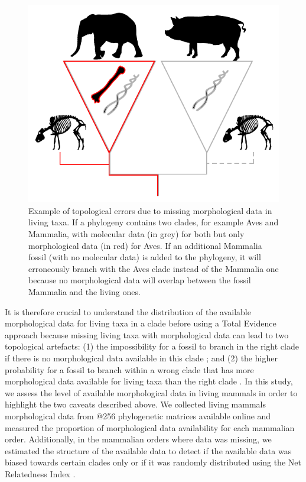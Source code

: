 \documentclass[12pt,letterpaper]{article}
\begin{document}
\begin{figure}[!htbp]
\centering
    \includegraphics[width=1\textwidth]{MissingDataFigure.pdf}
\caption{Example of topological errors due to missing morphological data in living taxa. If a phylogeny contains two clades, for example Aves and Mammalia, with molecular data (in grey) for both but only morphological data (in red) for Aves. If an additional Mammalia fossil (with no molecular data) is added to the phylogeny, it will erroneously branch with the Aves clade instead of the Mammalia one because no morphological data will overlap between the fossil Mammalia and the living ones.}
\label{Figure_missing_data_problem}
\end{figure}

It is therefore crucial to understand the distribution of the available morphological data for living taxa in a clade before using a Total Evidence approach because missing living taxa with morphological data can lead to two topological artefacts: (1) the impossibility for a fossil to branch in the right clade if there is no morphological data available in this clade \cite{GuillermeCooper}; and (2) the higher probability for a fossil to branch within a wrong clade that has more morphological data available for living taxa than the right clade \cite{GuillermeCooper}. In this study, we assess the level of available morphological data in living mammals in order to highlight the two caveats described above.
We collected living mammals morphological data from @256 phylogenetic matrices available online and measured the proportion of morphological data availability for each mammalian order. Additionally, in the mammalian orders where data was missing, we estimated the structure of the available data to detect if the available data was biased towards certain clades only or if it was randomly distributed using the Net Relatedness Index \cite{webb2002phylogenies}.
\end{document}
